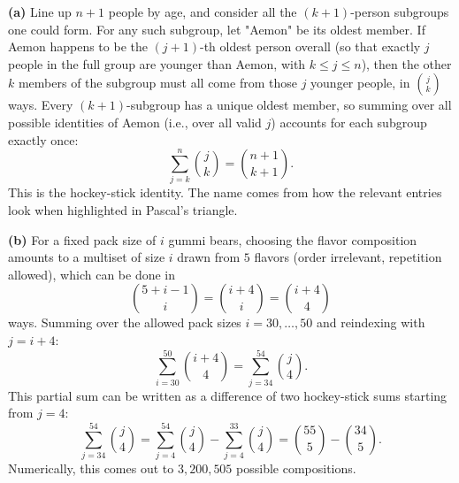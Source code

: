 \documentclass{article}
\begin{document}
\textbf{(a)} Line up $n+1$ people by age, and consider all the $(k+1)$-person subgroups one could form. For any such subgroup, let "Aemon" be its oldest member. If Aemon happens to be the $(j+1)$-th oldest person overall (so that exactly $j$ people in the full group are younger than Aemon, with $k \le j \le n$), then the other $k$ members of the subgroup must all come from those $j$ younger people, in $\binom{j}{k}$ ways. Every $(k+1)$-subgroup has a unique oldest member, so summing over all possible identities of Aemon (i.e., over all valid $j$) accounts for each subgroup exactly once:
$$\sum_{j=k}^{n} \binom{j}{k} = \binom{n+1}{k+1}.$$
This is the hockey-stick identity. The name comes from how the relevant entries look when highlighted in Pascal's triangle.

\medskip
\textbf{(b)} For a fixed pack size of $i$ gummi bears, choosing the flavor composition amounts to a multiset of size $i$ drawn from $5$ flavors (order irrelevant, repetition allowed), which can be done in
$$\binom{5+i-1}{i} = \binom{i+4}{i} = \binom{i+4}{4}$$
ways. Summing over the allowed pack sizes $i=30,\dots,50$ and reindexing with $j=i+4$:
$$\sum_{i=30}^{50} \binom{i+4}{4} = \sum_{j=34}^{54} \binom{j}{4}.$$
This partial sum can be written as a difference of two hockey-stick sums starting from $j=4$:
$$\sum_{j=34}^{54}\binom{j}{4} = \sum_{j=4}^{54}\binom{j}{4} - \sum_{j=4}^{33}\binom{j}{4} = \binom{55}{5} - \binom{34}{5}.$$
Numerically, this comes out to $3{,}200{,}505$ possible compositions.
\end{document}
